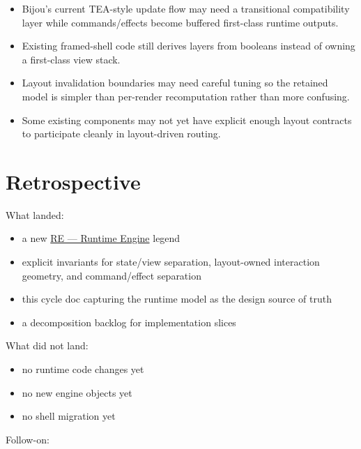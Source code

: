 \begin{itemize}
\tightlist
\item
  Bijou's current TEA-style update flow may need a transitional compatibility layer while commands/effects become buffered first-class runtime outputs.
\item
  Existing framed-shell code still derives layers from booleans instead of owning a first-class view stack.
\item
  Layout invalidation boundaries may need careful tuning so the retained model is simpler than per-render recomputation rather than more confusing.
\item
  Some existing components may not yet have explicit enough layout contracts to participate cleanly in layout-driven routing.
\end{itemize}

\section{Retrospective}\label{record-149-retrospective}

What landed:

\begin{itemize}
\tightlist
\item
  a new \href{https://github.com/flyingrobots/bijou/blob/1853ad902f6bf219326409e7f743a5a1d6517dbc/docs/legends/RE-runtime-engine.md}{RE --- Runtime Engine} legend
\item
  explicit invariants for state/view separation, layout-owned interaction geometry, and command/effect separation
\item
  this cycle doc capturing the runtime model as the design source of truth
\item
  a decomposition backlog for implementation slices
\end{itemize}

What did not land:

\begin{itemize}
\tightlist
\item
  no runtime code changes yet
\item
  no new engine objects yet
\item
  no shell migration yet
\end{itemize}

Follow-on:

